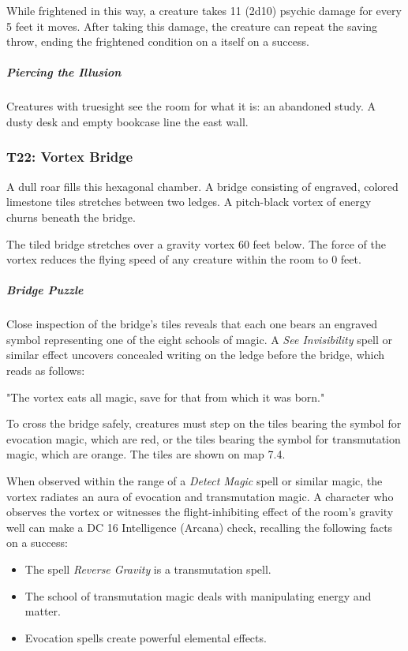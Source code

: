 \documentclass[10pt,a4paper,twoside,bg=print,twocolumn,openany,nodeprecatedcode]{dndbook}
\begin{document}
While frightened in this way, a creature takes 11 (2d10) psychic damage for every 5 feet it moves. After taking this damage, the creature can repeat the saving throw, ending the frightened condition on a itself on a success.

\subparagraph{Piercing the Illusion}
Creatures with truesight see the room for what it is: an abandoned study. A dusty desk and empty bookcase line the east wall.

\subsubsection{T22: Vortex Bridge}
\begin{DndReadAloud}{}
A dull roar fills this hexagonal chamber. A bridge consisting of engraved, colored limestone tiles stretches between two ledges. A pitch-black vortex of energy churns beneath the bridge.

\end{DndReadAloud}

The tiled bridge stretches over a gravity vortex 60 feet below. The force of the vortex reduces the flying speed of any creature within the room to 0 feet.

\subparagraph{Bridge Puzzle}
Close inspection of the bridge's tiles reveals that each one bears an engraved symbol representing one of the eight schools of magic. A \textit{See Invisibility} spell or similar effect uncovers concealed writing on the ledge before the bridge, which reads as follows:

\begin{DndReadAloud}{}
"The vortex eats all magic, save for that from which it was born."

\end{DndReadAloud}

To cross the bridge safely, creatures must step on the tiles bearing the symbol for evocation magic, which are red, or the tiles bearing the symbol for transmutation magic, which are orange. The tiles are shown on map 7.4.

When observed within the range of a \textit{Detect Magic} spell or similar magic, the vortex radiates an aura of evocation and transmutation magic. A character who observes the vortex or witnesses the flight-inhibiting effect of the room's gravity well can make a DC 16 Intelligence (Arcana) check, recalling the following facts on a success:


\begin{itemize}
\item The spell \textit{Reverse Gravity} is a transmutation spell.
\item The school of transmutation magic deals with manipulating energy and matter.
\item Evocation spells create powerful elemental effects.
\end{itemize}
\end{document}
